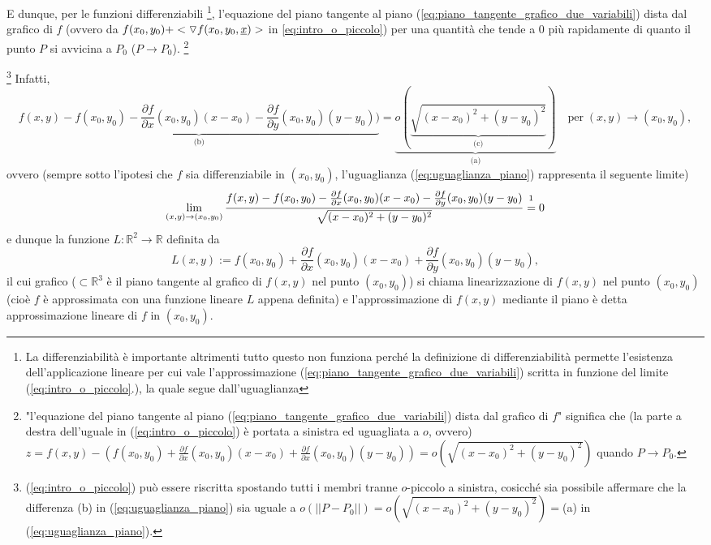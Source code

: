 E dunque, per le funzioni differenziabili \footnote{La differenziabilità è importante altrimenti tutto questo non funziona perché la definizione di differenziabilità permette l'esistenza dell'applicazione lineare per cui vale l'approssimazione (\ref{eq:piano_tangente_grafico_due_variabili}) scritta in funzione del limite (\ref{eq:intro_o_piccolo}.), la quale segue dall'uguaglianza }, l'equazione del piano tangente al piano (\ref{eq:piano_tangente_grafico_due_variabili}) dista dal grafico di $f$ (ovvero da $f(x_0,y_0) + <\triangledown f(x_0,y_0, \uline x)>$ in \ref{eq:intro_o_piccolo}) per una quantità che tende a $0$ più rapidamente di quanto il punto $P$ si avvicina a $P_0$ ($P\rightarrow P_0$). \footnote{"l'equazione del piano tangente al piano (\ref{eq:piano_tangente_grafico_due_variabili}) dista dal grafico di $f$" significa che (la parte a destra dell'uguale in (\ref{eq:intro_o_piccolo}) è portata a sinistra ed uguagliata a $o$, ovvero) $z= f(x,y) -  (f(x_0, y_0) + \frac{\partial f}{\partial x} (x_0, y_0)(x-x_0)+ \frac{\partial f}{\partial x} (x_0,y_0) (y-y_0))=o\left(\sqrt{(x-x_0)^2 + (y-y_0)^2}\right)$ quando $P\rightarrow P_0$.}

\footnote{(\ref{eq:intro_o_piccolo}) può essere riscritta spostando tutti i membri tranne $o$-piccolo a sinistra, cosicché sia possibile affermare che la differenza (b) in (\ref{eq:uguaglianza_piano}) sia uguale a $o(||P-P_0||) = o\left(\sqrt{(x-x_0)^2 + (y-y_0)^2}\right)=$(a) in (\ref{eq:uguaglianza_piano}).} Infatti,
\begin{equation}\label{eq:uguaglianza_piano}
	\underbrace{f(x,y)  -  f(x_0, y_0) - \frac{\partial f}{\partial x} (x_0, y_0)(x-x_0) - \frac{\partial f}{\partial y} (x_0,y_0) (y-y_0))}_{\text{(b)}}=\underbrace{o\left(\underbrace{\sqrt{(x-x_0)^2 + (y-y_0)^2}}_{\text{(c)}}\right)}_{\text{(a)}}\quad\text{per}\; (x,y)\rightarrow(x_0,y_0),
\end{equation}
ovvero (sempre sotto l'ipotesi che $f$ sia differenziabile in $(x_0, y_0)$, l'uguaglianza (\ref{eq:uguaglianza_piano}) rappresenta il seguente limite)
\begin{equation*}
	\lim\limits_{(x,y)\rightarrow(x_0,y_0)}\frac{f(x,y) - f(x_0,y_0) -  \frac{\partial f}{\partial x}(x_0, y_0)(x-x_0) - \frac{\partial f}{\partial y}(x_0, y_0)(y-y_0)}{\sqrt{(x-x_0)^2+(y-y_0)^2}} \overset{\footnotemark}{=} 0
\end{equation*}
e dunque la funzione $L:\mathbb{R}^2\rightarrow\mathbb{R}$ definita da
\begin{equation*}
	L(x,y) := f(x_0,y_0) + \frac{\partial f}{\partial x}(x_0, y_0)(x-x_0) + \frac{\partial f}{\partial y}(x_0, y_0)(y-y_0),
\end{equation*}
il cui grafico ($\subset\mathbb{R}^3$ è il piano tangente al grafico di $f(x,y)$ nel punto $(x_0,y_0)$) si chiama linearizzazione di $f(x,y)$ nel punto $(x_0, y_0)$ (cioè $f$ è approssimata con una funzione lineare $L$ appena definita) e l'approssimazione di $f(x,y)$ mediante il piano è detta approssimazione lineare di $f$ in  $(x_0, y_0)$.

